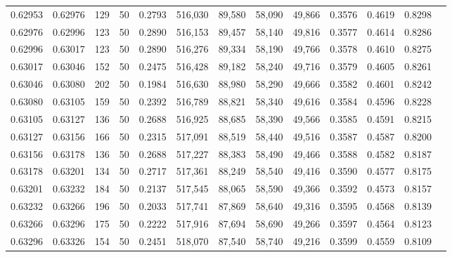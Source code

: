\begin{tabular}{rrrrrrrrrrrrr}
0.62953 & 0.62976 &   129 &  50 &                                     0.2793 & 516,030 &  89,580 &  58,090 &  49,866 & 0.3576 & 0.4619 & 0.8298 \\
0.62976 & 0.62996 &   123 &  50 &                                     0.2890 & 516,153 &  89,457 &  58,140 &  49,816 & 0.3577 & 0.4614 & 0.8286 \\
0.62996 & 0.63017 &   123 &  50 &                                     0.2890 & 516,276 &  89,334 &  58,190 &  49,766 & 0.3578 & 0.4610 & 0.8275 \\
0.63017 & 0.63046 &   152 &  50 &                                     0.2475 & 516,428 &  89,182 &  58,240 &  49,716 & 0.3579 & 0.4605 & 0.8261 \\
0.63046 & 0.63080 &   202 &  50 &                                     0.1984 & 516,630 &  88,980 &  58,290 &  49,666 & 0.3582 & 0.4601 & 0.8242 \\
0.63080 & 0.63105 &   159 &  50 &                                     0.2392 & 516,789 &  88,821 &  58,340 &  49,616 & 0.3584 & 0.4596 & 0.8228 \\
0.63105 & 0.63127 &   136 &  50 &                                     0.2688 & 516,925 &  88,685 &  58,390 &  49,566 & 0.3585 & 0.4591 & 0.8215 \\
0.63127 & 0.63156 &   166 &  50 &                                     0.2315 & 517,091 &  88,519 &  58,440 &  49,516 & 0.3587 & 0.4587 & 0.8200 \\
0.63156 & 0.63178 &   136 &  50 &                                     0.2688 & 517,227 &  88,383 &  58,490 &  49,466 & 0.3588 & 0.4582 & 0.8187 \\
0.63178 & 0.63201 &   134 &  50 &                                     0.2717 & 517,361 &  88,249 &  58,540 &  49,416 & 0.3590 & 0.4577 & 0.8175 \\
0.63201 & 0.63232 &   184 &  50 &                                     0.2137 & 517,545 &  88,065 &  58,590 &  49,366 & 0.3592 & 0.4573 & 0.8157 \\
0.63232 & 0.63266 &   196 &  50 &                                     0.2033 & 517,741 &  87,869 &  58,640 &  49,316 & 0.3595 & 0.4568 & 0.8139 \\
0.63266 & 0.63296 &   175 &  50 &                                     0.2222 & 517,916 &  87,694 &  58,690 &  49,266 & 0.3597 & 0.4564 & 0.8123 \\
0.63296 & 0.63326 &   154 &  50 &                                     0.2451 & 518,070 &  87,540 &  58,740 &  49,216 & 0.3599 & 0.4559 & 0.8109 \\

\end{tabular}
